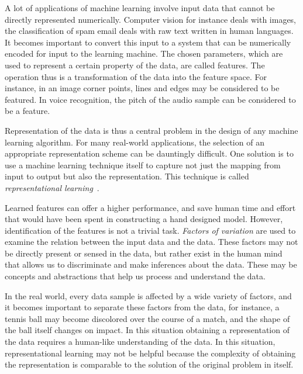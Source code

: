 A lot of applications of machine learning involve input data that cannot be directly represented numerically. Computer vision for instance deals with images, the classification of spam email deals with raw text written in human languages. It becomes important to convert this input to a system that can be numerically encoded for input to the learning machine. The chosen parameters, which are used to represent a certain property of the data, are called features. The operation thus is a transformation of the data into the feature space. For instance, in an image corner points, lines and edges may be considered to be featured. In voice recognition, the pitch of the audio sample can be considered to be a feature.

Representation of the data is thus a central problem in the design of any machine learning algorithm. For many real-world applications, the selection of an appropriate representation scheme can be dauntingly difficult. One solution is to use a machine learning technique itself to capture not just the mapping from input to output but also the representation. This technique is called \emph{representational learning}~\cite{bengio2013representation}.

Learned features can offer a higher performance, and save human time and effort that would have been spent in constructing a hand designed model. However, identification of the features is not a trivial task.
\emph{Factors of variation} are used to examine the relation between the input data and the data. These factors may not be directly present or sensed in the data, but rather exist in the human mind that allows us to discriminate and make inferences about the data. These may be concepts and abstractions that help us process and understand the data.  


In the real world, every data sample is affected by a wide variety of factors, and it becomes important to separate these factors from the data, for instance, a tennis ball may become discolored over the course of a match, and the shape of the ball itself changes on impact. In this situation obtaining a representation of the data requires a human-like understanding of the data. In this situation, representational learning may not be helpful because the complexity of obtaining the representation is comparable to the solution of the original problem in itself.

